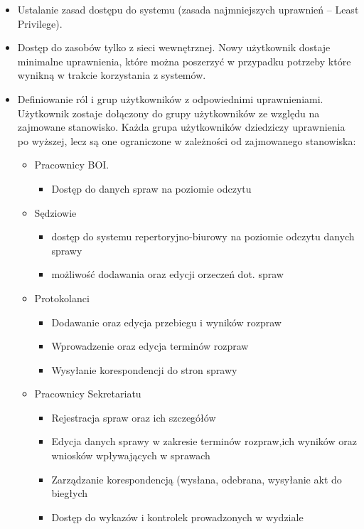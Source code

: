 \begin{itemize}
\item Ustalanie zasad dostępu do systemu (zasada najmniejszych uprawnień – Least Privilege).
    \item Dostęp do zasobów tylko z sieci wewnętrznej. \newline
    Nowy użytkownik dostaje minimalne uprawnienia, które można poszerzyć w przypadku potrzeby które wynikną w trakcie korzystania z systemów. 
    
    \item Definiowanie ról i grup użytkowników z odpowiednimi uprawnieniami.
    \newline Użytkownik zostaje dołączony do grupy użytkowników ze względu na zajmowane stanowisko. Każda grupa użytkowników dziedziczy uprawnienia po wyższej, lecz są one ograniczone w zależności od zajmowanego stanowiska: 
    
    \begin{itemize}
        \item{Pracownicy BOI.}
        \begin{itemize}
            \item {Dostęp do danych spraw na poziomie odczytu}
        \end{itemize}
        
        \item{Sędziowie}
        \begin{itemize}
            \item {dostęp do systemu repertoryjno-biurowy na poziomie odczytu danych sprawy}
            \item {możliwość dodawania oraz edycji orzeczeń dot. spraw}
        \end{itemize}
  
        \item{Protokolanci}
        \begin{itemize}
            \item {Dodawanie oraz edycja przebiegu i wyników rozpraw}
            \item {Wprowadzenie oraz edycja terminów rozpraw}
            \item {Wysyłanie korespondencji do stron sprawy}
        \end{itemize}
        
        \item{Pracownicy Sekretariatu}
        \begin{itemize}
            \item {Rejestracja spraw oraz ich szczegółów}
            \item {Edycja danych sprawy w zakresie terminów rozpraw,ich wyników oraz wniosków wpływających w sprawach}
            \item {Zarządzanie korespondencją (wysłana, odebrana, wysyłanie akt do biegłych}
            \item {Dostęp do wykazów i kontrolek prowadzonych w wydziale}
        \end{itemize}
        

\end{itemize}
\end{itemize}
